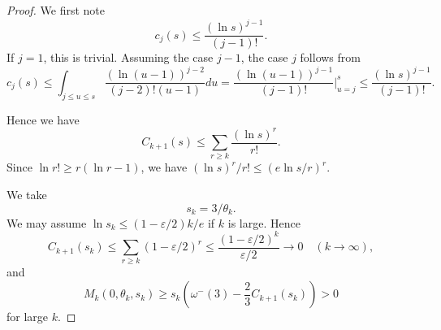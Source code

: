 \documentclass{amsart}
\theoremstyle{definition}
\theoremstyle{remark}
\newcommand{\1}{
    \bm{1}
}
\begin{document}
\begin{proof}

We first note
\begin{equation} \label{cjb} c_j(s) \leq \frac{(\ln{s})^{j-1}}{(j-1)!}. \end{equation}
If $j=1$, this is trivial. Assuming the case $j-1$, the case $j$ follows from
\[ c_j(s) \leq \int_{j\leq u \leq s} \frac{(\ln{(u-1)})^{j-2}}{(j-2)! (u-1)} du = \frac{(\ln{(u-1)})^{j-1}}{(j-1)!} \Big|_{u=j}^{s} \leq \frac{(\ln{s})^{j-1}}{(j-1)!}. \]

Hence we have
\[ C_{k+1}(s) \leq \sum_{r\geq k} \frac{(\ln{s})^r}{r!}. \]
Since $\ln{r!} \geq r(\ln{r}-1)$, we have $(\ln{s})^r/r! \leq \left( e \ln{s}/r \right)^r$. 

We take
\[ s_k = 3/\theta_k. \]
We may assume $\ln{s_k} \leq (1-\varepsilon/2)k/e$ if $k$ is large. Hence
\[ C_{k+1}(s_k) \leq \sum_{r \geq k} (1-\varepsilon/2)^r \leq \frac{(1-\varepsilon/2)^k}{\varepsilon/2} \to 0 \quad (k \to \infty), \]
and
\[ M_k(0,\theta_k,s_k) \geq s_k \left( \omega^-(3) - \frac{2}{3} C_{k+1}(s_k) \right) >0 \]
for large $k$. 
\end{proof}








\nocite{*}

\end{document}
